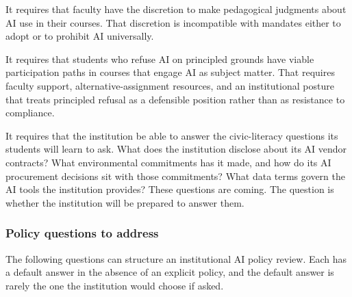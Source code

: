 \documentclass[12pt]{article}
\begin{document}
It requires that faculty have the discretion to make pedagogical judgments about AI use in their courses. That discretion is incompatible with mandates either to adopt or to prohibit AI universally.

It requires that students who refuse AI on principled grounds have viable participation paths in courses that engage AI as subject matter. That requires faculty support, alternative-assignment resources, and an institutional posture that treats principled refusal as a defensible position rather than as resistance to compliance.

It requires that the institution be able to answer the civic-literacy questions its students will learn to ask. What does the institution disclose about its AI vendor contracts? What environmental commitments has it made, and how do its AI procurement decisions sit with those commitments? What data terms govern the AI tools the institution provides? These questions are coming. The question is whether the institution will be prepared to answer them.

\subsubsection*{Policy questions to address}

The following questions can structure an institutional AI policy review. Each has a default answer in the absence of an explicit policy, and the default answer is rarely the one the institution would choose if asked.
\end{document}
